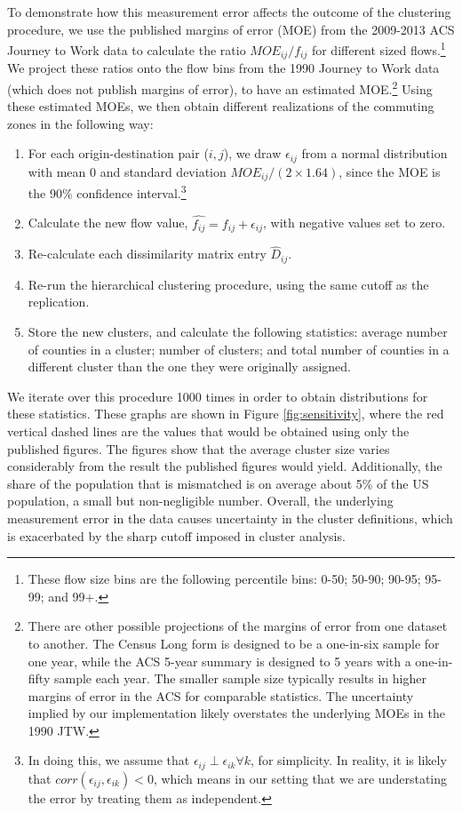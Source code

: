 To demonstrate how this measurement error affects the outcome of the clustering procedure, we use the published margins of error (MOE) from the 2009-2013 ACS Journey to Work data to calculate the ratio $MOE_{ij}/f_{ij}$ for different sized flows.\footnote{These flow size bins are the following percentile bins: 0-50; 50-90; 90-95; 95-99; and 99+.} We project these ratios onto the flow bins from the 1990 Journey to Work data (which does not publish margins of error), to have an estimated MOE.\footnote{There are other possible projections of the margins of error from one dataset to another. The Census Long form is designed to be a one-in-six sample for one year, while the ACS 5-year summary is designed to 5 years with a one-in-fifty sample each year. The smaller sample size typically results in higher margins of error in the ACS for comparable statistics. The uncertainty implied by our implementation likely overstates the underlying MOEs in the 1990 JTW.} Using these estimated MOEs, we then obtain different realizations of the commuting zones in the following way:

\begin{enumerate}
	\item For each origin-destination pair ($i,j$), we draw $\epsilon_{ij}$ from a normal distribution with mean 0 and standard deviation $MOE_{ij}/(2 \times 1.64)$, since the MOE is the 90\% confidence interval.\footnote{In doing this, we assume that $\epsilon_{ij} \perp \epsilon_{ik} \forall k$, for simplicity. In reality, it is likely that $corr(\epsilon_{ij},\epsilon_{ik})<0$, which means in our setting that we are understating the error by treating them as independent.}
	\item Calculate the new flow value, $\hat{f_{ij}} = f_{ij} + \epsilon_{ij}$, with negative values set to zero.
	\item Re-calculate each dissimilarity matrix entry $\hat{D}_{ij}$. 
	\item Re-run the hierarchical clustering procedure, using the same cutoff as the replication.
	\item Store the new clusters, and calculate the following statistics: average number of counties in a cluster; number of clusters; and total number of counties in a different cluster than the one they were originally assigned.
\end{enumerate}

We iterate over this procedure 1000 times in order to obtain distributions for these statistics. These graphs are shown in Figure \ref{fig:sensitivity}, where the red vertical dashed lines are the values that would be obtained using only the published figures. The figures show that the average cluster size varies considerably from the result the published figures would yield. Additionally, the share of the population that is mismatched is on average about 5\% of the US population, a small but non-negligible number. Overall, the underlying measurement error in the data causes uncertainty in the cluster definitions, which is exacerbated by the sharp cutoff imposed in cluster analysis.

